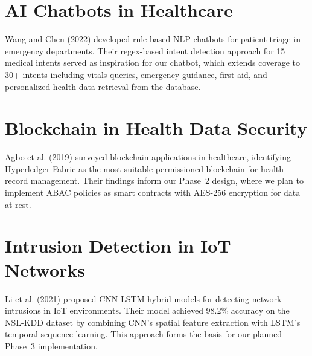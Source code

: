 \section{AI Chatbots in Healthcare}
Wang and Chen (2022) developed rule-based NLP chatbots for patient triage in emergency departments. Their regex-based intent detection approach for 15 medical intents served as inspiration for our chatbot, which extends coverage to 30+ intents including vitals queries, emergency guidance, first aid, and personalized health data retrieval from the database.

\section{Blockchain in Health Data Security}
Agbo et al. (2019) surveyed blockchain applications in healthcare, identifying Hyperledger Fabric as the most suitable permissioned blockchain for health record management. Their findings inform our Phase~2 design, where we plan to implement ABAC policies as smart contracts with AES-256 encryption for data at rest.

\section{Intrusion Detection in IoT Networks}
Li et al. (2021) proposed CNN-LSTM hybrid models for detecting network intrusions in IoT environments. Their model achieved 98.2\% accuracy on the NSL-KDD dataset by combining CNN's spatial feature extraction with LSTM's temporal sequence learning. This approach forms the basis for our planned Phase~3 implementation.

